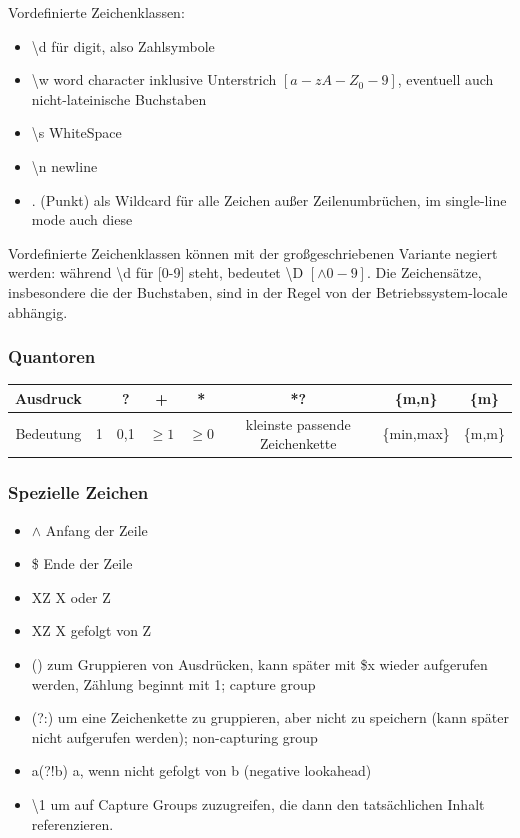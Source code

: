 \documentclass[12pt,a4]{article}
\begin{document}
 	Vordefinierte Zeichenklassen:
 	\begin{itemize}
 		\item \textbackslash d für digit, also Zahlsymbole
 		\item \textbackslash w word character inklusive Unterstrich \(\left[a-zA-Z_0-9\right]\), eventuell auch nicht-lateinische Buchstaben
 		\item \textbackslash s WhiteSpace
 		\item \textbackslash n newline
 		\item . (Punkt) als Wildcard für alle Zeichen außer Zeilenumbrüchen, im single-line mode auch diese
 	\end{itemize}
 Vordefinierte Zeichenklassen können mit der großgeschriebenen Variante negiert werden: während \textbackslash d für [0-9] steht, bedeutet \textbackslash D \(\left[\wedge 0-9\right]\).
 Die Zeichensätze, insbesondere die der Buchstaben, sind in der Regel von der Betriebssystem-locale abhängig.
	\subsubsection{Quantoren}
	
	\begin{center}
	\begin{tabular}{|c|c|c|c|c|c|c|c|}
		\hline 
		Ausdruck&  & ? & + & *&*?&\{m,n\}&\{m\}\\ 
		\hline 
		Bedeutung&  1&  0,1& \(\geq 1\) &  \(\geq 0\)&kleinste passende Zeichenkette&\{min,max\}&\{m,m\}\\ 
		\hline 
	\end{tabular} 
\end{center}

\subsubsection{Spezielle Zeichen}
\begin{itemize}
	\item \(\wedge\) Anfang der Zeile
	\item \$ Ende der Zeile
	\item X\textbar Z X oder Z
	\item XZ X gefolgt von Z
	\item () zum Gruppieren von Ausdrücken, kann später mit \$x wieder aufgerufen werden, Zählung beginnt mit 1; capture group
	\item (?:) um eine Zeichenkette zu gruppieren, aber nicht zu speichern (kann später nicht aufgerufen werden); non-capturing group
	\item a(?!b) a, wenn nicht gefolgt von b (negative lookahead)
	\item \textbackslash 1 um auf Capture Groups zuzugreifen, die dann den tatsächlichen Inhalt referenzieren.
	
\end{itemize}
\end{document}
